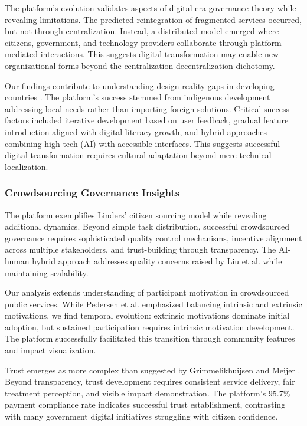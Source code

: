 \documentclass[pdflatex,sn-mathphys-num]{sn-jnl}%
\theoremstyle{thmstyleone}%
\theoremstyle{thmstyletwo}%
\theoremstyle{thmstylethree}%
\begin{document}
The platform's evolution validates aspects of digital-era governance theory \cite{dunleavy2006new} while revealing limitations. The predicted reintegration of fragmented services occurred, but not through centralization. Instead, a distributed model emerged where citizens, government, and technology providers collaborate through platform-mediated interactions. This suggests digital transformation may enable new organizational forms beyond the centralization-decentralization dichotomy.

Our findings contribute to understanding design-reality gaps in developing countries \cite{heeks2018ict4d}. The platform's success stemmed from indigenous development addressing local needs rather than importing foreign solutions. Critical success factors included iterative development based on user feedback, gradual feature introduction aligned with digital literacy growth, and hybrid approaches combining high-tech (AI) with accessible interfaces. This suggests successful digital transformation requires cultural adaptation beyond mere technical localization.

\subsubsection{Crowdsourcing Governance Insights}

The platform exemplifies Linders' \cite{linders2012we} citizen sourcing model while revealing additional dynamics. Beyond simple task distribution, successful crowdsourced governance requires sophisticated quality control mechanisms, incentive alignment across multiple stakeholders, and trust-building through transparency. The AI-human hybrid approach addresses quality concerns raised by Liu et al. \cite{liu2014crowdsourcing} while maintaining scalability.

Our analysis extends understanding of participant motivation in crowdsourced public services. While Pedersen et al. \cite{pedersen2013crowdsourcing} emphasized balancing intrinsic and extrinsic motivations, we find temporal evolution: extrinsic motivations dominate initial adoption, but sustained participation requires intrinsic motivation development. The platform successfully facilitated this transition through community features and impact visualization.

Trust emerges as more complex than suggested by Grimmelikhuijsen and Meijer \cite{grimmelikhuijsen2018legitimacy}. Beyond transparency, trust development requires consistent service delivery, fair treatment perception, and visible impact demonstration. The platform's 95.7\% payment compliance rate indicates successful trust establishment, contrasting with many government digital initiatives struggling with citizen confidence.
\end{document}
